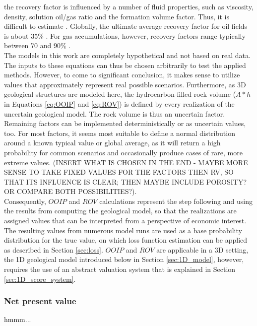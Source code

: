         the recovery factor is influenced by a number of fluid properties, such as viscosity, density, solution oil/gas ratio and the formation volume factor. Thus, it is difficult to estimate \citep{dean2007volumetric}. Globally, the ultimate average recovery factor for oil fields is about 35\% \citep{labastie2011increasingRF}. For gas accumulations, however, recovery factors range typically between 70 and 90\% \citep{dean2007volumetric}.\\
        The models in this work are completely hypothetical and not based on real data. The inputs to these equations can thus be chosen arbitrarily to test the applied methods. However, to come to significant conclusion, it makes sense to utilize values that approximately represent real possible scenarios. Furthermore, as 3D geological structures are modeled here, the hydrocarbon-filled rock volume ($A * h$ in Equations \ref{eq:OOIP} and \ref{eq:ROV}) is defined by every realization of the uncertain geological model. The rock volume is thus an uncertain factor. Remaining factors can be implemented deterministically or as uncertain values, too. For most factors, it seems most suitable to define a normal distribution around a known typical value or global average, as it will return a high probability for common scenarios and occasionally produce cases of rare, more extreme values. (INSERT WHAT IS CHOSEN IN THE END - MAYBE MORE SENSE TO TAKE FIXED VALUES FOR THE FACTORS THEN RV, SO THAT ITS INFLUENCE IS CLEAR; THEN MAYBE INCLUDE POROSITY? OR COMPARE BOTH POSSIBILITIES?).\\
        Consequently, $OOIP$ and $ROV$ calculations represent the step following and using the results from computing the geological model, so that the realizations are assigned values that can be interpreted from a perspective of economic interest. The resulting values from numerous model runs are used as a base probability distribution for the true value, on which loss function estimation can be applied as described in Section \ref{sec:loss}. $OOIP$ and $ROV$ are applicable in a 3D setting, the 1D geological model introduced below in Section \ref{sec:1D_model}, however, requires the use of an abstract valuation system that is explained in Section \ref{sec:1D_score_system}.
        
        \subsubsection{Net present value}
        hmmm...
        

